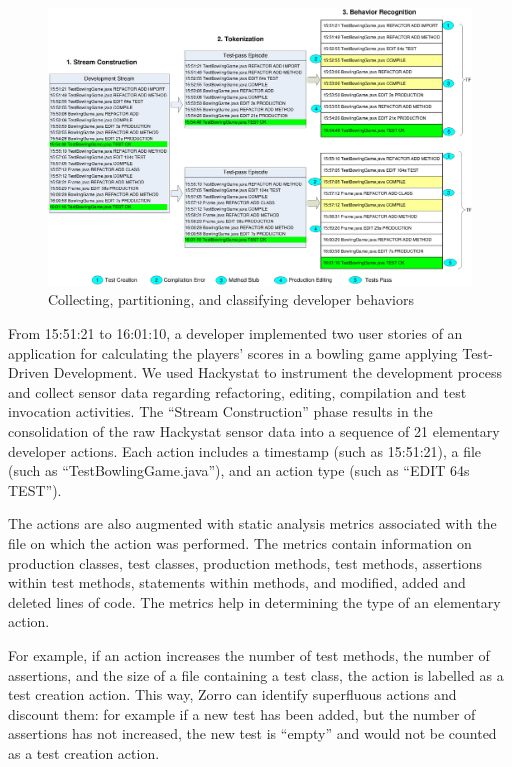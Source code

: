 \documentclass[smallextended]{svjour3}     %
\begin{document}
\begin{figure}[htbp]
  \centering
  \includegraphics[width=1.0\textwidth]{Visio-SDSA-Example}
  \caption{Collecting, partitioning, and classifying developer behaviors}
  \label{fig:SDSA-Example}
\end{figure}

From 15:51:21 to 16:01:10, a developer implemented two user stories of an
application for calculating the players' scores in a bowling game applying
Test-Driven Development. We used Hackystat to instrument the development
process and collect sensor data regarding refactoring, editing, compilation
and test invocation activities.  The ``Stream Construction'' phase results
in the consolidation of the raw Hackystat sensor data into a sequence of 21
elementary developer actions. Each action includes a timestamp (such as
15:51:21), a file (such as ``TestBowlingGame.java''), and an action type
(such as ``EDIT 64s TEST''). 

The actions are also augmented with static
analysis metrics associated with the file on which the action was
performed. The metrics contain information on production classes, test
classes, production methods, test methods, assertions within test methods,
statements within methods, and modified, added and deleted lines of
code. The metrics help in determining the type of an elementary action.

For example, if an action increases the number of test methods, the number of assertions, and the size of a file containing a test class, the action is labelled as a test creation action. This way, Zorro can identify superfluous actions and discount them: for example if a new test has been added, but the number of assertions has not increased, the new test is ``empty'' and would not be counted as a test creation action.
\end{document}
